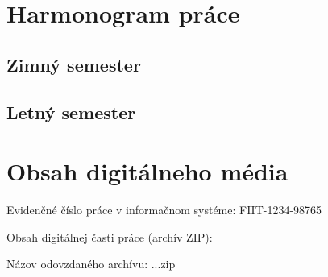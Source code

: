 \documentclass[12pt, a4paper, twoside, openright, slovak]{book}
\newcommand{\RegNo}[0] {FIIT-1234-98765}
\begin{document}
\thispagestyle{empty}
\chapter{Harmonogram práce}
\renewcommand*{\thepage}{B-\arabic{page}}
\section{Zimný semester}
\section{Letný semester}

\thispagestyle{empty}

\chapter{Obsah digitálneho média}
\renewcommand*{\thepage}{C-\arabic{page}}
\par Evidenčné číslo práce v informačnom systéme: \RegNo
\par Obsah digitálnej časti práce (archív ZIP):
\par Názov odovzdaného archívu: ...zip
\end{document}
